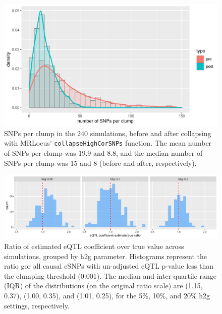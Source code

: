 \documentclass[11pt]{article}
\begin{document}
\begin{figure}[!ht]
  \centering
  \includegraphics[width=.7\textwidth]{figs/snps_per_clump}
  \caption{SNPs per clump in the 240 simulations, before and after
    collapsing with MRLocus’ \texttt{collapseHighCorSNPs}
    function. The mean number of SNPs per clump was 19.9 and 8.8, and
    the median number of SNPs per clump was 15 and 8 (before and
    after, respectively).}
\end{figure}

\begin{figure}[!ht]
  \centering
  \includegraphics[width=\textwidth]{figs/sim_overest}
  \caption{Ratio of estimated eQTL coefficient over true value across
    simulations, grouped by h2g parameter. Histograms represent the
    ratio gor all causal eSNPs with un-adjusted eQTL p-value less than
    the clumping threshold (0.001). The median and inter-quartile
    range (IQR) of the distributions (on the original ratio scale) are
    (1.15, 0.37), (1.00, 0.35), and (1.01, 0.25), for
    the 5\%, 10\%, and 20\% h2g settings, respectively.}
\end{figure}
\end{document}
